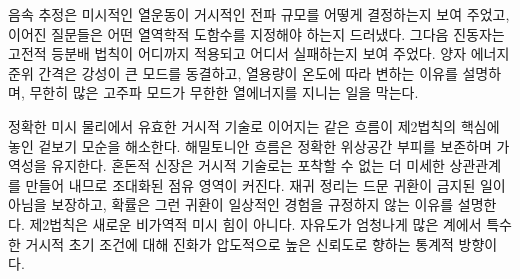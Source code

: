 음속 추정은 미시적인 열운동이 거시적인 전파 규모를 어떻게 결정하는지 보여 주었고, 이어진 질문들은 어떤 열역학적 도함수를 지정해야 하는지 드러냈다. 그다음 진동자는 고전적 등분배 법칙이 어디까지 적용되고 어디서 실패하는지 보여 주었다. 양자 에너지 준위 간격은 강성이 큰 모드를 동결하고, 열용량이 온도에 따라 변하는 이유를 설명하며, 무한히 많은 고주파 모드가 무한한 열에너지를 지니는 일을 막는다.

정확한 미시 물리에서 유효한 거시적 기술로 이어지는 같은 흐름이 제2법칙의 핵심에 놓인 겉보기 모순을 해소한다. 해밀토니안 흐름은 정확한 위상공간 부피를 보존하며 가역성을 유지한다. 혼돈적 신장은 거시적 기술로는 포착할 수 없는 더 미세한 상관관계를 만들어 내므로 조대화된 점유 영역이 커진다. 재귀 정리는 드문 귀환이 금지된 일이 아님을 보장하고, 확률은 그런 귀환이 일상적인 경험을 규정하지 않는 이유를 설명한다. 제2법칙은 새로운 비가역적 미시 힘이 아니다. 자유도가 엄청나게 많은 계에서 특수한 거시적 초기 조건에 대해 진화가 압도적으로 높은 신뢰도로 향하는 통계적 방향이다.